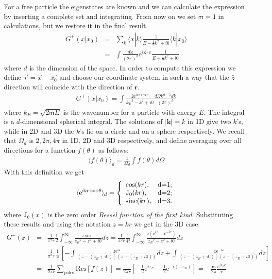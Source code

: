 \documentclass[onecolumn,fleqn, 11pt]{revtex4}
\newcommand{\sinc}{\mathrm{sinc}}
\newcommand{\eexp}{\mathrm{e}^}
\newcommand{\mass}{\mathsf{m}}
\newcommand{\tbox}[1]{\text{#1}}
\newcommand{\beq}{\begin{eqnarray}}
\newcommand{\eeq}{\end{eqnarray}}
\begin{document}
For a free particle the eigenstates are known and we can calculate 
the expression by inserting a complete set and integrating.
From now on we set $\mass=1$ in calculations, but we restore it in 
the final result.
\beq
G^+(x|x_0)&=&
\sum_k\langle x|k\rangle \frac{1}{E-\frac 12 k^2 +i0}\langle k|x_0 \rangle 
\\ \nonumber
&=&\int\frac{d\mathbf{k}}{(2\pi)^d}\eexp{i\mathbf{k}\cdot\mathbf{r}}
\frac{1}{E-\frac 12 k^2 +i0}
\eeq
where $d$ is the dimension of the space. In order to compute this expression 
we define $\vec{r}=\vec{x}-\vec{x_0}$
and choose our coordinate system in such a way 
that the $\hat{z}$ direction will coincide with the direction of $\mathbf{r}$.
\beq
G^+(x|x_0)=\int \frac{2\eexp{ikr\cos\theta}}{{k_E}^2-k^2+i0}\frac{d\Omega k^{d-1}dk}{(2\pi)^d}
\eeq
where $k_E=\sqrt{2 \mass E}$ is the wavenumber for a particle with energy $E$. The integral is a
$d$-dimensional spherical integral. The solutions of $|\mathbf{k}|=k$ in 1D give two $k$'s, 
while in 2D and 3D the $k$'s lie on a circle and on a sphere respectively. 
We recall that $\Omega_d$ is $2,2\pi,4\pi$ in 1D, 2D and 3D respectively, and define   
averaging over all directions for a function $f(\theta)$ as follows:
\beq
\langle f(\theta)\rangle_d=\frac{1}{\Omega_d}\int f(\theta) d\Omega
\eeq
With this definition we get
\beq
\langle \eexp{ikr\cos\theta}\rangle_d
=\left\{
\begin{array}{ll}
\cos(kr), & \hbox{d=1;} \\
\mathrm{J_0}(kr), & \hbox{d=2;} \\
\sinc(kr), & \hbox{d=3.} \\
\end{array}
\right.
\eeq
where $\mathrm{J_0}(x)$ is the zero order \textit{Bessel function of the first kind}. 
Substituting these results and using the notation $z=kr$ we get in the 3D case:
\beq
G^+(\mathbf{r})
&=&
\frac{1}{\pi^2 r} 
\frac 12 {\int_{-\infty}^\infty} 
\frac{z\sin z}{{z_E}^2-z^2+i0}dz
=
\frac{1}{\pi^2 r} 
\frac {1}{4i} 
{\int_{-\infty}^\infty} 
\frac{z(\eexp{iz}-\eexp{-iz})}{{z_E}^2-z^2+i0}dz 
\\ \nonumber
&=&
\frac{1}{\pi^2 r} 
\frac {1}{4i}                     
\left[-\int \frac{z \eexp{iz}}{(z-(z_E+i0))(z+(z_E+i0))}dz                          
+\int \frac{z \eexp{-iz}}{(z-(z_E+i0))(z+(z_E+i0))}dz\right] 
\\ \nonumber
&=&
\frac{1}{2\pi r}
\sum_{\tbox{poles}}\mathrm{Res}[f(z)]
=
\frac{1}{2\pi r} 
\left[-\frac 12 \eexp{iz_E}-\frac 12 \eexp{-i(-z_E)}\right]
=
-\frac{\mass}{2\pi} \frac{\eexp{ik_E r}}{r}
\eeq
\end{document}
